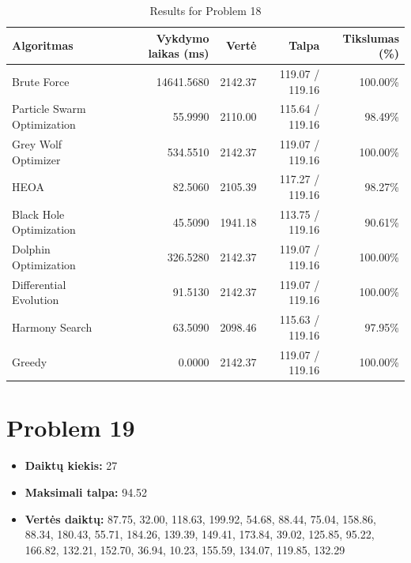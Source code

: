 \documentclass[a4paper,11pt]{article}
\begin{document}
\begin{table}[h!]
\centering
\begin{tabular}{lrrrr}
\toprule
\textbf{Algoritmas} & \textbf{Vykdymo laikas (ms)} & \textbf{Vertė} & \textbf{Talpa} & \textbf{Tikslumas (\%)} \\
\midrule
Brute Force & 14641.5680 & 2142.37 & 119.07 / 119.16 & 100.00\% \\
Particle Swarm Optimization & 55.9990 & 2110.00 & 115.64 / 119.16 & 98.49\% \\
Grey Wolf Optimizer & 534.5510 & 2142.37 & 119.07 / 119.16 & 100.00\% \\
HEOA & 82.5060 & 2105.39 & 117.27 / 119.16 & 98.27\% \\
Black Hole Optimization & 45.5090 & 1941.18 & 113.75 / 119.16 & 90.61\% \\
Dolphin Optimization & 326.5280 & 2142.37 & 119.07 / 119.16 & 100.00\% \\
Differential Evolution & 91.5130 & 2142.37 & 119.07 / 119.16 & 100.00\% \\
Harmony Search & 63.5090 & 2098.46 & 115.63 / 119.16 & 97.95\% \\
Greedy & 0.0000 & 2142.37 & 119.07 / 119.16 & 100.00\% \\
\bottomrule
\end{tabular}
\caption{Results for Problem 18}
\end{table}
\clearpage

\section*{Problem 19}
\begin{itemize}
    \item \textbf{Daiktų kiekis:} 27
    \item \textbf{Maksimali talpa:} 94.52
    \item \textbf{Vertės daiktų:} 87.75, 32.00, 118.63, 199.92, 54.68, 88.44, 75.04, 158.86, 88.34, 180.43, 55.71, 184.26, 139.39, 149.41, 173.84, 39.02, 125.85, 95.22, 166.82, 132.21, 152.70, 36.94, 10.23, 155.59, 134.07, 119.85, 132.29
\end{itemize}
\end{document}
